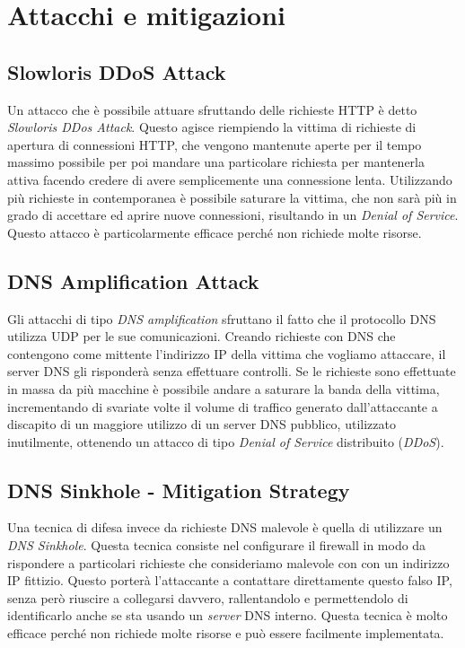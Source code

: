 \chapter{Attacchi e mitigazioni}
\label{appendix:security}

\section{Slowloris DDoS Attack}
\label{atk:slowloris}

Un attacco che è possibile attuare sfruttando delle richieste HTTP è detto \emph{Slowloris DDos Attack}\cite{site:cloudflare-slowloris}. Questo agisce riempiendo la vittima di richieste di apertura di connessioni HTTP, che vengono mantenute aperte per il tempo massimo possibile per poi mandare una particolare richiesta per mantenerla attiva facendo credere di avere semplicemente una connessione lenta. Utilizzando più richieste in contemporanea è possibile saturare la vittima, che non sarà più in grado di accettare ed aprire nuove connessioni, risultando in un \emph{Denial of Service}. Questo attacco è particolarmente efficace perché non richiede molte risorse.

\section{DNS Amplification Attack}
\label{atk:dns-amplification}

Gli attacchi di tipo \emph{DNS amplification}\cite{site:cloudflare-dns-amplification} sfruttano il fatto che il protocollo DNS utilizza UDP per le sue comunicazioni. Creando richieste con DNS che contengono come mittente l'indirizzo IP della vittima che vogliamo attaccare, il server DNS gli risponderà senza effettuare controlli. Se le richieste sono effettuate in massa da più macchine è possibile andare a saturare la banda della vittima, incrementando di svariate volte il volume di traffico generato dall'attaccante a discapito di un maggiore utilizzo di un server DNS pubblico, utilizzato inutilmente, ottenendo un attacco di tipo \emph{Denial of Service} distribuito (\emph{DDoS}).

\section{DNS Sinkhole - Mitigation Strategy}
\label{atk:dns-sinkhole}

Una tecnica di difesa invece da richieste DNS malevole è quella di utilizzare un \emph{DNS Sinkhole}\cite{site:paloalto-dns-sinkhole}. Questa tecnica consiste nel configurare il firewall in modo da rispondere a particolari richieste che consideriamo malevole con con un indirizzo IP fittizio. Questo porterà l'attaccante a contattare direttamente questo falso IP, senza però riuscire a collegarsi davvero, rallentandolo e permettendolo di identificarlo anche se sta usando un \emph{server} DNS interno. Questa tecnica è molto efficace perché non richiede molte risorse e può essere facilmente implementata.

